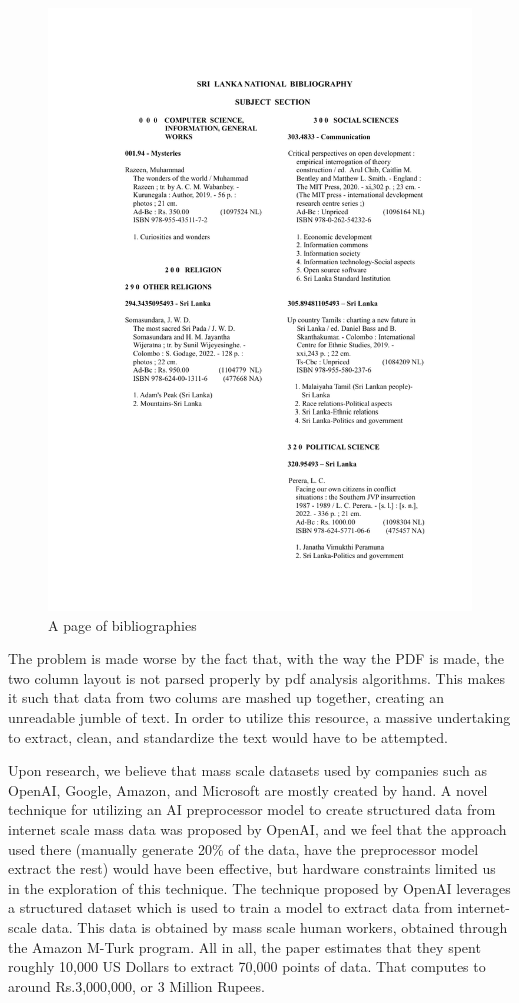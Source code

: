 \begin{figure}[htbp]
    \centering
    \includegraphics[width=1\textwidth]{../../assets/slnb_june_pg47.png}
    \caption{A page of bibliographies}
    \label{fig:slnbpage}
\end{figure}

The problem is made worse by the fact that, with the way the PDF is made, the two column layout is not parsed properly by pdf analysis algorithms. This makes it such that data from two colums are mashed up together, creating an unreadable jumble of text. In order to utilize this resource, a massive undertaking to extract, clean, and standardize the text would have to be attempted.

Upon research, we believe that mass scale datasets used by companies such as OpenAI, Google, Amazon, and Microsoft are mostly created by hand. A novel technique for utilizing an AI preprocessor model to create structured data from internet scale mass data was proposed by OpenAI, and we feel that the approach used there (manually generate 20\% of the data, have the preprocessor model extract the rest) would have been effective, but hardware constraints limited us in the exploration of this technique.
The technique proposed by OpenAI leverages a structured dataset which is used to train a model to extract data from internet-scale data. This data is obtained by mass scale human workers, obtained through the Amazon M-Turk program. All in all, the paper estimates that they spent roughly 10,000 US Dollars to extract 70,000 points of data. That computes to around Rs.3,000,000, or 3 Million Rupees.

